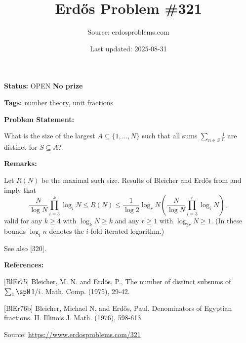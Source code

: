 \documentclass{article}
\title{Erd\H{o}s Problem \#321}
\date{Last updated: 2025-08-31}
\author{Source: erdosproblems.com}
\begin{document}
\maketitle

\noindent\textbf{Status:} OPEN \quad \textbf{No prize}

\noindent\textbf{Tags:} number theory, unit fractions

\medskip
\noindent\textbf{Problem Statement:}

What is the size of the largest $A\subseteq \{1,\ldots,N\}$ such that all sums $\sum_{n\in S}\frac{1}{n}$ are distinct for $S\subseteq A$?

\bigskip
\noindent\textbf{Remarks:}

Let $R(N)$ be the maximal such size. Results of Bleicher and Erd\H{o}s from \cite{BlEr75} and \cite{BlEr76b} imply that\[\frac{N}{\log N}\prod_{i=3}^k\log_iN\leq R(N)\leq \frac{1}{\log 2}\log_r N\left(\frac{N}{\log N} \prod_{i=3}^r \log_iN\right),\]valid for any $k\geq 4$ with $\log_kN\geq k$ and any $r\geq 1$ with $\log_{2r}N\geq 1$. (In these bounds $\log_in$ denotes the $i$-fold iterated logarithm.)

See also [320].

\bigskip
\noindent\textbf{References:}

[BlEr75] Bleicher, M. N. and Erd\H{o}s, P., The number of distinct subsums of $\sum \sb{1}\spN\,1/i$. Math. Comp. (1975), 29-42.
 
 [BlEr76b] Bleicher, Michael N. and Erd\H{o}s, Paul, Denominators of Egyptian fractions. II. Illinois J. Math. (1976), 598-613.

\bigskip
\noindent\small{Source: \url{https://www.erdosproblems.com/321}}
\end{document}
